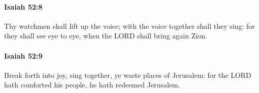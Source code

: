 		\paragraph{Isaiah 52:8} %
			\label{ISAIAH-52-8}

			Thy watchmen shall lift up the voice; with the voice together shall they sing: for they shall see eye to eye, when the LORD shall bring again Zion.


		\paragraph{Isaiah 52:9} %
			\label{ISAIAH-52-9}

			Break forth into joy, sing together, ye waste places of Jerusalem: for the LORD hath comforted his people, he hath redeemed Jerusalem.


